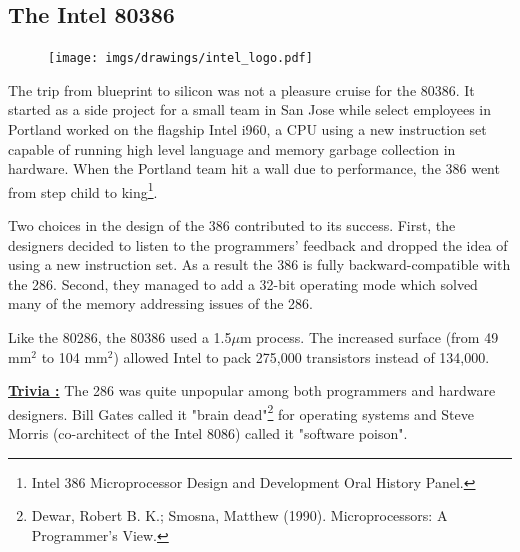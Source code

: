 \documentclass[book.tex]{subfiles}
\begin{document}
\subsection{The Intel 80386}
  \begin{figure}
\centering
\vspace{-10pt}
\texttt{[image: imgs/drawings/intel\_logo.pdf]}
\end{figure}
The trip from blueprint to silicon was not a pleasure cruise for the 80386. It started as a side project for a small team in San Jose while select employees in Portland worked on the flagship Intel i960, a CPU using a new instruction set capable of running high level language and memory garbage collection in hardware. When the Portland team hit a wall due to performance, the 386 went from step child to king\footnote{Intel 386 Microprocessor Design and Development Oral History Panel.}.\\
\par
Two choices in the design of the 386 contributed to its success. First, the designers decided to listen to the programmers' feedback and dropped the idea of using a new instruction set. As a result the 386 is fully backward-compatible with the 286. Second, they managed to add a 32-bit operating mode which solved many of the memory addressing issues of the 286.\\
\par
Like the 80286, the 80386 used a 1.5$\mu$m process. The increased surface (from 49 mm$^2$ to 104 mm$^2$) allowed Intel to pack 275,000 transistors instead of 134,000.\\
\par
\textbf{\underline{Trivia :}}  The 286 was quite unpopular among both programmers and hardware designers. Bill Gates called it "brain dead"\footnote{Dewar, Robert B. K.; Smosna, Matthew (1990). Microprocessors: A Programmer's View.} for operating systems and Steve Morris (co-architect of the Intel 8086) called it "software poison".\\
\par


\par \vspace{-1pt}
\begin{minipage}{0.48\textwidth}
\centering
{} 

\end{minipage}
\hfill
\begin{minipage}{0.48\textwidth}
\centering
{}
\end{minipage}
\end{document}
